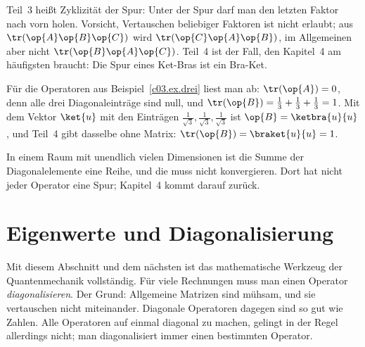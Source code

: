 Teil~3 heißt Zyklizität der Spur: Unter der Spur darf man den letzten Faktor nach vorn holen.
Vorsicht, Vertauschen beliebiger Faktoren ist nicht erlaubt; aus $\tr(\op{A}\op{B}\op{C})$ wird
$\tr(\op{C}\op{A}\op{B})$, im Allgemeinen aber nicht $\tr(\op{B}\op{A}\op{C})$. Teil~4 ist der Fall,
den Kapitel~4 am häufigsten braucht: Die Spur eines Ket-Bras ist ein Bra-Ket.

\begin{example}\label{c03.ex.spur}
  Für die Operatoren aus Beispiel~\ref{c03.ex.drei} liest man ab: $\tr(\op{A}) = 0$, denn alle
  drei Diagonaleinträge sind null, und $\tr(\op{B}) = \tfrac13 + \tfrac13 + \tfrac13 = 1$. Mit
  dem Vektor $\ket{u}$ mit den Einträgen $\tfrac{1}{\sqrt{3}}, \tfrac{1}{\sqrt{3}}, \tfrac{1}{\sqrt{3}}$
  ist $\op{B} = \ketbra{u}{u}$, und Teil~4 gibt dasselbe ohne Matrix:
  $\tr(\op{B}) = \braket{u}{u} = 1$.
\end{example}

In einem Raum mit unendlich vielen Dimensionen ist die Summe der Diagonalelemente eine Reihe,
und die muss nicht konvergieren. Dort hat nicht jeder Operator eine Spur; Kapitel~4 kommt darauf
zurück.

\section{Eigenwerte und Diagonalisierung}\label{c03.s14}

Mit diesem Abschnitt und dem nächsten ist das mathematische Werkzeug der Quantenmechanik
vollständig. Für viele Rechnungen muss man einen Operator \emph{diagonalisieren}. Der Grund:
Allgemeine Matrizen sind mühsam, und sie vertauschen nicht miteinander. Diagonale Operatoren
dagegen sind so gut wie Zahlen. Alle Operatoren auf einmal diagonal zu machen, gelingt in der
Regel allerdings nicht; man diagonalisiert immer einen bestimmten Operator.

